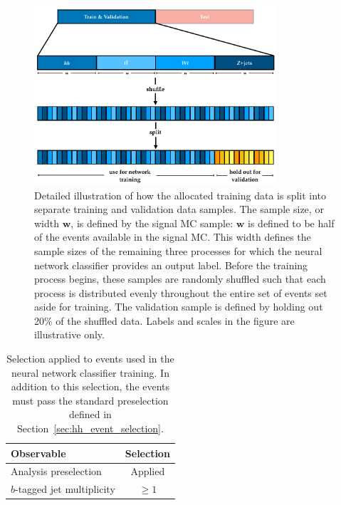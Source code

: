 \begin{figure}[!htb]
    \begin{center}
        \includegraphics[width=0.8\textwidth]{figures/search_hh/mva/wwbb_nn_sample_split_detail}
        \caption{
            Detailed illustration of how the allocated training data is split into separate training
            and validation data samples.
            The sample size, or width $\bm{w}$, is defined by the signal MC sample: $\bm{w}$ is defined
            to be half of the events available in the signal MC.
            This width defines the sample sizes of the remaining three processes for which the neural network
            classifier provides an output label.
            Before the training process begins, these samples are randomly shuffled such that each process is distributed
            evenly throughout the entire set of events set aside for training.
            The validation sample is defined by holding out 20\% of the shuffled data.
            Labels and scales in the figure are illustrative only.
        }
        \label{fig:nn_sample_shuffle}
    \end{center}
\end{figure}

\begin{table}[!htb]
    \begin{center}
        \caption{
            Selection applied to events used in the neural network classifier training.
            In addition to this selection, the events must pass the standard preselection
            defined in Section~\ref{sec:hh_event_selection}.
        }
        \label{tab:train_selection}
        \begin{tabular}{l|c}
        \hline
        \hline
            \textbf{Observable} & \textbf{Selection} \\
            \hline
            Analysis preselection & Applied \\
            $b$-tagged jet multiplicity & $\ge 1$ \\
        \hline
        \hline
        \end{tabular}
    \end{center}
\end{table}

